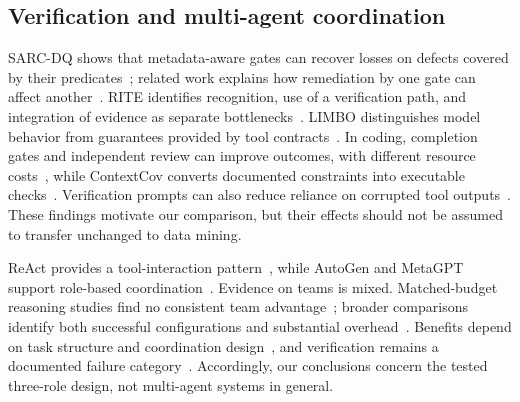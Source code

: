 \documentclass[conference]{IEEEtran}
\begin{document}
\subsection{Verification and multi-agent coordination}
SARC-DQ shows that metadata-aware gates can recover losses on defects covered by their predicates~\cite{besanson2026sarcdq}; related work explains how remediation by one gate can affect another~\cite{besanson2026onegate}. RITE identifies recognition, use of a verification path, and integration of evidence as separate bottlenecks~\cite{zhang2026rite}. LIMBO distinguishes model behavior from guarantees provided by tool contracts~\cite{li2026limbo}. In coding, completion gates and independent review can improve outcomes, with different resource costs~\cite{zhang2026rethinking}, while ContextCov converts documented constraints into executable checks~\cite{sharma2026contextcov}. Verification prompts can also reduce reliance on corrupted tool outputs~\cite{yang2026overreliance}. These findings motivate our comparison, but their effects should not be assumed to transfer unchanged to data mining.

ReAct provides a tool-interaction pattern~\cite{yao2023react}, while AutoGen and MetaGPT support role-based coordination~\cite{wu2023autogen,hong2024metagpt}. Evidence on teams is mixed. Matched-budget reasoning studies find no consistent team advantage~\cite{tran2026single,dylan2026equalcost}; broader comparisons identify both successful configurations and substantial overhead~\cite{fu2026moreagents,jwalapuram2026illusion}. Benefits depend on task structure and coordination design~\cite{kim2025scaling}, and verification remains a documented failure category~\cite{cemri2025mas}. Accordingly, our conclusions concern the tested three-role design, not multi-agent systems in general.
\end{document}

